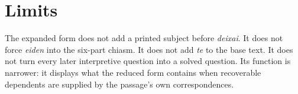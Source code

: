 \section{Limits}

The expanded form does not add a printed subject before \textit{deixai}. It does not force \textit{eiden} into the six-part chiasm. It does not add \textit{te} to the base text. It does not turn every later interpretive question into a solved question. Its function is narrower: it displays what the reduced form contains when recoverable dependents are supplied by the passage's own correspondences.
